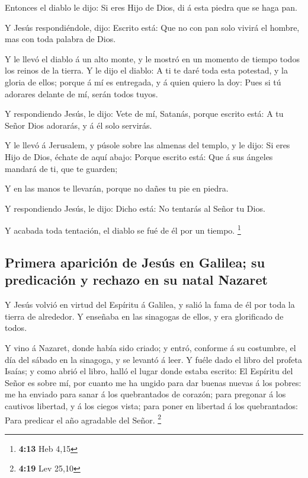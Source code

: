  Entonces el diablo le dijo: Si eres Hijo de Dios, di á esta
piedra que se haga pan.

 Y Jesús respondiéndole, dijo: Escrito está: Que no con pan
solo vivirá el hombre, mas con toda palabra de Dios.

 Y le llevó el diablo á un alto monte, y le mostró en un
momento de tiempo todos los reinos de la tierra.  Y le dijo
el diablo: A ti te daré toda esta potestad, y la gloria de ellos; porque
á mí es entregada, y á quien quiero la doy:  Pues si tú
adorares delante de mí, serán todos tuyos.

 Y respondiendo Jesús, le dijo: Vete de mí, Satanás, porque
escrito está: A tu Señor Dios adorarás, y á él solo servirás.

 Y le llevó á Jerusalem, y púsole sobre las almenas del
templo, y le dijo: Si eres Hijo de Dios, échate de aquí abajo:
 Porque escrito está: Que á sus ángeles mandará de ti, que
te guarden;

 Y en las manos te llevarán, porque no dañes tu pie en
piedra.

 Y respondiendo Jesús, le dijo: Dicho está: No tentarás al
Señor tu Dios.

 Y acabada toda tentación, el diablo se fué de él por un
tiempo. \footnote{\textbf{4:13} Heb 4,15}

\hypertarget{primera-apariciuxf3n-de-jesuxfas-en-galilea-su-predicaciuxf3n-y-rechazo-en-su-natal-nazaret}{%
\subsection{Primera aparición de Jesús en Galilea; su predicación y
rechazo en su natal
Nazaret}\label{primera-apariciuxf3n-de-jesuxfas-en-galilea-su-predicaciuxf3n-y-rechazo-en-su-natal-nazaret}}

 Y Jesús volvió en virtud del Espíritu á Galilea, y salió
la fama de él por toda la tierra de alrededor.  Y enseñaba
en las sinagogas de ellos, y era glorificado de todos.

 Y vino á Nazaret, donde había sido criado; y entró,
conforme á su costumbre, el día del sábado en la sinagoga, y se levantó
á leer.  Y fuéle dado el libro del profeta Isaías; y como
abrió el libro, halló el lugar donde estaba escrito:  El
Espíritu del Señor es sobre mí, por cuanto me ha ungido para dar buenas
nuevas á los pobres: me ha enviado para sanar á los quebrantados de
corazón; para pregonar á los cautivos libertad, y á los ciegos vista;
para poner en libertad á los quebrantados:  Para predicar
el año agradable del Señor. \footnote{\textbf{4:19} Lev 25,10}

